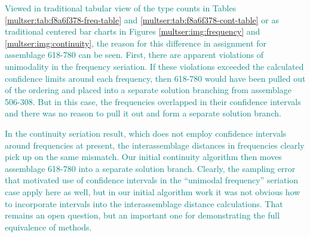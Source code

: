 \textcolor{teal}{Viewed in traditional tabular view of the type counts in Tables
\ref{multser:tab:f8a6f378-freq-table} and \ref{multser:tab:f8a6f378-cont-table} or as
traditional centered bar charts in Figures \ref{multser:img:frequency} and
\ref{multser:img:continuity}, the reason for this difference in assignment for assemblage 618-780 can be seen. First, there are
apparent violations of unimodality in the frequency seriation.  If these violations exceeded the calculated confidence limits around each frequency, then 618-780 would have been pulled out of the ordering and placed into a separate solution branching from assemblage 506-308.  But in this case, the frequencies overlapped in their confidence intervals and there was no reason to pull it out and form a separate solution branch.}

\textcolor{teal}{
In the continuity seriation result, which does not employ confidence intervals around frequencies at present, the interassemblage distances in frequencies clearly pick up on the same mismatch.  Our initial continuity algorithm then moves assemblage 618-780 into a separate solution branch.   Clearly, the sampling error that motivated use of confidence intervals in the ``unimodal frequency'' seriation case apply here as well, but in our initial algorithm work it was not obvious how to incorporate intervals into the interassemblage distance calculations.  That remains an open question, but an important one for demonstrating the full equivalence of methods.
}

